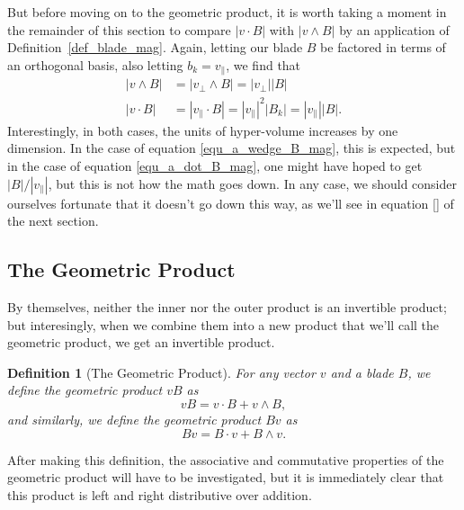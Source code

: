\documentclass[12pt]{article}
\numberwithin{equation}{section}
\newtheorem{definition}{Definition}[section]
\begin{document}
But before moving on to the geometric product, it is worth taking a moment in the remainder of this section
to compare $|v\cdot B|$ with $|v\wedge B|$ by an application of Definition~\ref{def_blade_mag}.
Again, letting our blade $B$ be factored in terms of an orthogonal basis, also letting $b_k=v_{\parallel}$,
we find that
\begin{align}
|v\wedge B|&=|v_{\perp}\wedge B|=|v_{\perp}||B|\label{equ_a_wedge_B_mag} \\
|v\cdot B|&=|v_{\parallel}\cdot B|=|v_{\parallel}|^2|B_k|=|v_{\parallel}||B|.\label{equ_a_dot_B_mag}
\end{align}
Interestingly, in both cases, the units of hyper-volume increases by one dimension.  In the
case of equation \eqref{equ_a_wedge_B_mag}, this is expected, but in the case of
equation \eqref{equ_a_dot_B_mag}, one might have hoped to get $|B|/|v_{\parallel}|$,
but this is not how the math goes down.  In any case, we should consider ourselves fortunate
that it doesn't go down this way, as we'll see in equation \eqref{} of the next section.




\subsection{The Geometric Product}\label{sec_geo_prod}

By themselves, neither the inner nor the outer product is an invertible
product; but interesingly, when we combine them into a new product that
we'll call the geometric product, we get an invertible product.
\begin{definition}[The Geometric Product]\label{def_vec_blade_geo_prod}
For any vector $v$ and a blade $B$, we define the geometric product $vB$ as
\begin{equation}
vB = v\cdot B + v\wedge B,
\end{equation}
and similarly, we define the geometric product $Bv$ as
\begin{equation}
Bv = B\cdot v + B\wedge v.
\end{equation}
\end{definition}
After making this definition, the associative and commutative properties of the geometric product will have
to be investigated, but it is immediately clear that this product is left and right distributive over
addition.
\end{document}
